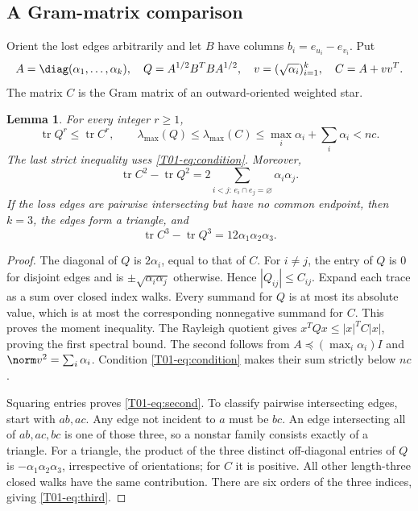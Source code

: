 \documentclass[11pt,a4paper]{article}
\newtheorem{lemma}[theorem]{Lemma}
\theoremstyle{definition}\newtheorem{definition}[theorem]{Definition}
\theoremstyle{remark}\newtheorem{remark}[theorem]{Remark}
\DeclareMathOperator{\tr}{tr}\DeclareMathOperator{\supp}{supp}\DeclareMathOperator{\TV}{TV}
\numberwithin{equation}{section}
\begin{document}
\subsection{A Gram-matrix comparison}\label{T01-sec-2}
Orient the lost edges arbitrarily and let $B$ have columns $b_i=e_{u_i}-e_{v_i}$. Put
\[
 A=\diag(\alpha_1,\ldots,\alpha_k),\quad Q=A^{1/2}B^TBA^{1/2},\quad
 v=(\sqrt{\alpha_i})_{i=1}^k,\quad C=A+vv^T.
\]
The matrix $C$ is the Gram matrix of an outward-oriented weighted star.
\begin{lemma}\label{T01-lem:moments}
For every integer $r\ge1$,
\[
 \tr Q^r\le\tr C^r,\qquad
 \lambda_{\max}(Q)\le\lambda_{\max}(C)\le\max_i\alpha_i+\sum_i\alpha_i<nc.
\]
The last strict inequality uses \eqref{T01-eq:condition}. Moreover,
\begin{equation}\label{T01-eq:second}
 \tr C^2-\tr Q^2=2\sum_{i<j:\,e_i\cap e_j=\varnothing}\alpha_i\alpha_j.
\end{equation}
If the loss edges are pairwise intersecting but have no common endpoint, then $k=3$, the edges form a triangle, and
\begin{equation}\label{T01-eq:third}
 \tr C^3-\tr Q^3=12\alpha_1\alpha_2\alpha_3.
\end{equation}
\end{lemma}
\begin{proof}
The diagonal of $Q$ is $2\alpha_i$, equal to that of $C$. For $i\ne j$, the entry of $Q$ is $0$ for disjoint edges and is $\pm\sqrt{\alpha_i\alpha_j}$ otherwise. Hence $|Q_{ij}|\le C_{ij}$. Expand each trace as a sum over closed index walks. Every summand for $Q$ is at most its absolute value, which is at most the corresponding nonnegative summand for $C$. This proves the moment inequality. The Rayleigh quotient gives $x^TQx\le |x|^TC|x|$, proving the first spectral bound. The second follows from $A\preceq(\max_i\alpha_i)I$ and $\norm v^2=\sum_i\alpha_i$. Condition \eqref{T01-eq:condition} makes their sum strictly below $nc$.

Squaring entries proves \eqref{T01-eq:second}. To classify pairwise intersecting edges, start with $ab,ac$. Any edge not incident to $a$ must be $bc$. An edge intersecting all of $ab,ac,bc$ is one of those three, so a nonstar family consists exactly of a triangle. For a triangle, the product of the three distinct off-diagonal entries of $Q$ is $-\alpha_1\alpha_2\alpha_3$, irrespective of orientations; for $C$ it is positive. All other length-three closed walks have the same contribution. There are six orders of the three indices, giving \eqref{T01-eq:third}.
\end{proof}
\end{document}
